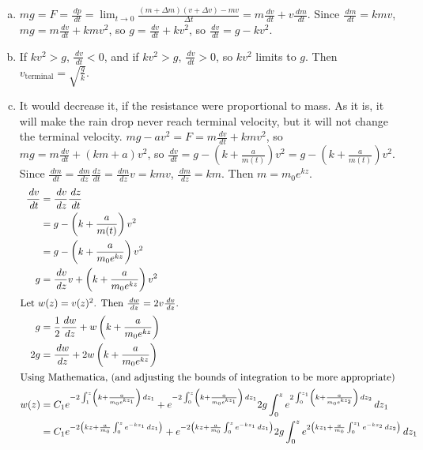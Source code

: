 \documentclass{esg8012pset}
\renewcommand{\d}{\,d}
\begin{document}
\begin{solution}
  \begin{enumerate}[a)]
    \item $m g = F = \frac{\d p}{\d t} = \lim_{t\rightarrow 0} \frac{(m + \Delta m)(v + \Delta v) - m v}{\Delta t} = m\frac{\d v}{\d t} + v \frac{\d m}{\d t}$.  Since $\frac{\d m}{\d t} = k m v$, $m g = m\frac{\d v}{\d t} + k m v^2$, so $g = \frac{\d v}{\d t} + k v^2$, so $\frac{\d v}{\d t} = g - k v^2$. 
    \item If $k v^2 > g$, $\frac{\d v}{\d t} < 0$, and if $k v^2 > g$, $\frac{\d v}{\d t} > 0$, so $k v^2$ limits to $g$.  Then $v_{\text{terminal}} = \sqrt{\frac{g}{k}}$.
    \item It would decrease it, if the resistance were proportional to mass.  As it is, it will make the rain drop never reach terminal velocity, but it will not change the terminal velocity.  $m g - a v^2 = F = m\frac{\d v}{\d t} + k m v^2$, so $m g = m\frac{\d v}{\d t} + (k m + a) v^2$, so $\frac{\d v}{\d t} = g - \left(k + \frac{a}{m(t)}\right) v^2 = g - \left(k + \frac{a}{m(t)}\right) v^2$.  Since $\frac{\d m}{\d t} = \frac{\d m}{\d z}\frac{\d z}{\d t} = \frac{\d m}{\d z}v = k m v$, $\frac{\d m}{\d z} = k m$.  Then $m = m_0 e^{k z}$.  \begin{align*}
   \frac{\d v}{\d t} & = \frac{\d v}{\d z} \frac{\d z}{\d t} \\
    & = g - \left(k + \frac{a}{m(t)}\right) v^2 \\
    & = g - \left(k + \frac{a}{m_0 e^{k z}}\right) v^2 \\
   g & = \frac{\d v}{\d z}v + \left(k + \frac{a}{m_0 e^{k z}}\right) v^2 \\
   \intertext{Let $w(z) = v(z)^2$.  Then $\frac{\d w}{\d z} = 2v\frac{\d v}{\d z}$.}
   g & = \frac{1}{2}\frac{\d w}{\d z} + w\left(k + \frac{a}{m_0 e^{k z}}\right) \\
   2g & = \frac{\d w}{\d z} + 2w\left(k + \frac{a}{m_0 e^{k z}}\right) \\
   \intertext{Using Mathematica, (and adjusting the bounds of integration to be more appropriate)}
   w(z) & = C_1 e^{-2\int_1^z \left(k + \frac{a}{m_0 e^{k z_1}}\right)\d z_1} + e^{-2\int_0^z \left(k + \frac{a}{m_0 e^{k z_1}}\right)\d z_1} 2g\int_0^z e^{2\int_0^{z_1}\left(k + \frac{a}{m_0 e^{k z_2}}\right)\d z_2} \d z_1 \\
    & = C_1 e^{-2\left( k z + \frac{a}{m_0} \int_0^z e^{-k z_1}\d z_1\right)} + e^{-2\left( k z + \frac{a}{m_0}\int_0^z e^{-k z_1}\d z_1\right)} 2g\int_0^z e^{2\left(k z_1 + \frac{a}{m_0}\int_0^{z_1}e^{-k z_2}\d z_2\right)} \d z_1 \\

\end{align*}
\end{enumerate}
\end{solution}
\end{document}
